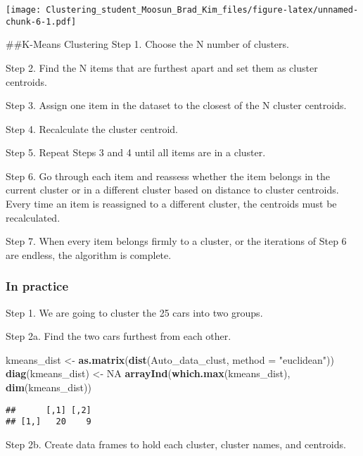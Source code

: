 \documentclass[11pt,]{article}
\newenvironment{Shaded}{\begin{snugshade}}{\end{snugshade}}
\newcommand{\DataTypeTok}[1]{\textcolor[rgb]{0.13,0.29,0.53}{#1}}
\newcommand{\KeywordTok}[1]{\textcolor[rgb]{0.13,0.29,0.53}{\textbf{#1}}}
\newcommand{\NormalTok}[1]{#1}
\newcommand{\OtherTok}[1]{\textcolor[rgb]{0.56,0.35,0.01}{#1}}
\newcommand{\StringTok}[1]{\textcolor[rgb]{0.31,0.60,0.02}{#1}}
\begin{document}
\texttt{[image: Clustering\_student\_Moosun\_Brad\_Kim\_files/figure-latex/unnamed-chunk-6-1.pdf]}

\newpage

\#\#K-Means Clustering Step 1. Choose the N number of clusters.

Step 2. Find the N items that are furthest apart and set them as cluster
centroids.

Step 3. Assign one item in the dataset to the closest of the N cluster
centroids.

Step 4. Recalculate the cluster centroid.

Step 5. Repeat Steps 3 and 4 until all items are in a cluster.

Step 6. Go through each item and reassess whether the item belongs in
the current cluster or in a different cluster based on distance to
cluster centroids. Every time an item is reassigned to a different
cluster, the centroids must be recalculated.

Step 7. When every item belongs firmly to a cluster, or the iterations
of Step 6 are endless, the algorithm is complete.

\hypertarget{in-practice-1}{%
\subsubsection{In practice}\label{in-practice-1}}

Step 1. We are going to cluster the 25 cars into two groups.

Step 2a. Find the two cars furthest from each other.

\begin{Shaded}
\begin{Highlighting}[]
\NormalTok{kmeans_dist <-}\StringTok{ }\KeywordTok{as.matrix}\NormalTok{(}\KeywordTok{dist}\NormalTok{(Auto_data_clust, }\DataTypeTok{method =} \StringTok{"euclidean"}\NormalTok{))}
\KeywordTok{diag}\NormalTok{(kmeans_dist) <-}\StringTok{ }\OtherTok{NA}
\KeywordTok{arrayInd}\NormalTok{(}\KeywordTok{which.max}\NormalTok{(kmeans_dist), }\KeywordTok{dim}\NormalTok{(kmeans_dist))}
\end{Highlighting}
\end{Shaded}

\begin{verbatim}
##      [,1] [,2]
## [1,]   20    9
\end{verbatim}

Step 2b. Create data frames to hold each cluster, cluster names, and
centroids.
\end{document}
